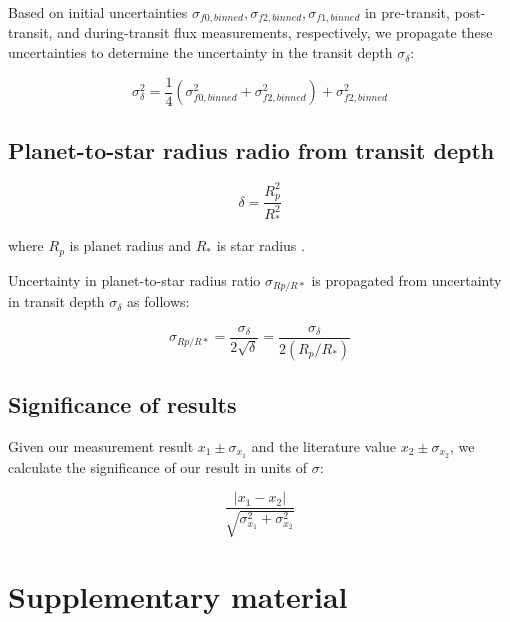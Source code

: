 \documentclass[twocolumn]{aastex631}
\begin{document}
Based on initial uncertainties $\sigma_{f0, binned}, \sigma_{f2, binned}, \sigma_{f1, binned}$ in pre-transit, post-transit, and during-transit flux measurements, respectively, we propagate these uncertainties to determine the uncertainty in the transit depth $\sigma_\delta$:

\begin{equation} \label{eqn:transit_depth_uncert}
    \sigma_\delta^2 = \frac{1}{4} (\sigma_{f0, binned}^2 + \sigma_{f2, binned}^2) + \sigma_{f2, binned}^2
\end{equation}

\subsection{Planet-to-star radius radio from transit depth}

\begin{equation} \label{eqn:transit_depth_radius_ratio}
    \delta = \frac{R_p^2}{R_*^2}
\end{equation}

where $R_p$ is planet radius and $R_*$ is star radius \citep{transit_algorithms_2020}.

Uncertainty in planet-to-star radius ratio $\sigma_{Rp/R*}$ is propagated from uncertainty in transit depth $\sigma_\delta$ as follows:

\begin{equation} \label{eqn:transit_depth_radius_ratio_uncert}
    \sigma_{Rp/R*} = \frac{\sigma_\delta}{2\sqrt{\delta}} = \frac{\sigma_\delta}{2(R_p/R_*)}
\end{equation}

\subsection{Significance of results}

Given our measurement result $x_1\pm \sigma_{x_1}$ and the literature value $x_2\pm \sigma_{x_2}$, we calculate the significance of our result in units of $\sigma$: \citep{vdl_2022}

\begin{equation} \label{eqn:significance}
    \frac{ |x_1 - x_2| }{ \sqrt{ \sigma_{x_1}^2 + \sigma_{x_2}^2 } }
\end{equation}

\section{Supplementary material}
\end{document}
